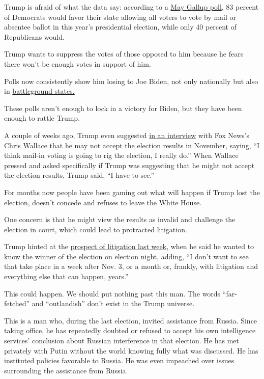 Trump is afraid of what the data say: according to a
\href{https://news.gallup.com/poll/310586/americans-favor-voting-mail-option-november.aspx}{May
Gallup poll}, 83 percent of Democrats would favor their state allowing
all voters to vote by mail or absentee ballot in this year's
presidential election, while only 40 percent of Republicans would.

Trump wants to suppress the votes of those opposed to him because he
fears there won't be enough votes in support of him.

Polls now consistently show him losing to Joe Biden, not only nationally
but also in
\href{https://www.nytimes3xbfgragh.onion/2020/06/25/upshot/poll-2020-biden-battlegrounds.html}{battleground
states.}

These polls aren't enough to lock in a victory for Biden, but they have
been enough to rattle Trump.

A couple of weeks ago, Trump even suggested
\href{https://youtu.be/W6XdpDOH1JA?t=2243}{in an interview} with Fox
News's Chris Wallace that he may not accept the election results in
November, saying, ``I think mail-in voting is going to rig the election,
I really do.'' When Wallace pressed and asked specifically if Trump was
suggesting that he might not accept the election results, Trump said,
``I have to see.''

For months now people have been gaming out what will happen if Trump
lost the election, doesn't concede and refuses to leave the White House.

One concern is that he might view the results as invalid and challenge
the election in court, which could lead to protracted litigation.

Trump hinted at the
\href{https://thehill.com/regulation/court-battles/509907-experts-dismiss-trump-claim-that-it-could-take-years-to-declare}{prospect
of litigation last week}, when he said he wanted to know the winner of
the election on election night, adding, ``I don't want to see that take
place in a week after Nov. 3, or a month or, frankly, with litigation
and everything else that can happen, years.''

This could happen. We should put nothing past this man. The words
``far-fetched'' and ``outlandish'' don't exist in the Trump universe.

This is a man who, during the last election, invited assistance from
Russia. Since taking office, he has repeatedly doubted or refused to
accept his own intelligence services' conclusion about Russian
interference in that election. He has met privately with Putin without
the world knowing fully what was discussed. He has instituted policies
favorable to Russia. He was even impeached over issues surrounding the
assistance from Russia.

